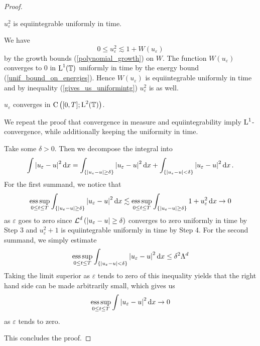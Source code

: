 \begin{proof}
\begin{description}[wide=0pt]
		\item[Step 4:] $ u_{ \varepsilon }^{ 2 } $ is equiintegrable uniformly 
		in time.
		
		We have 
		\begin{equation}
			\label{gives_us_uniformintg}
			0 \leq u_{ \varepsilon }^{ 2 } \lesssim 1 + W ( u_{ \varepsilon } )
		\end{equation}
		by the growth bounds (\ref{polynomial_growth}) on $ W $. The function $ 
		W ( u_{ \varepsilon } ) $ converges to 0 in $ \operatorname{L}^{ 1 } ( \operatorname{\mathbb{T}} ) 
		$ uniformly in time by the energy bound (\ref{unif_bound_on_energies}).
		Hence $ W ( u_{ \varepsilon } ) $ is equiintegrable uniformly in time 
		and by inequality (\ref{gives_us_uniformintg}) $ u_{ \varepsilon }^{ 2 
		} $ is as well.
		
		\item[Step 5:] $ u_{ \varepsilon } $ converges in $ \operatorname{C} \left( [ 0 , T ] ; \operatorname{L}^{ 2 } ( \operatorname{\mathbb{T}} ) \right) $.
		
		We repeat the proof that convergence in measure and 
		equiintegrability imply $ \operatorname{L}^{ 1 } $-convergence, while additionally 
		keeping the 
		uniformity in time.
		
		Take some $ \delta > 0 $. Then we decompose the integral into
		\begin{equation*}
			\int \abs{ u_{ \varepsilon } - u }^{ 2 } \dd{ x }
			=
			\int_{ \{ \abs{ u_{ \varepsilon } - u } \geq \delta \} }
			\abs{ u_{\varepsilon } - u }^{ 2 }
			\dd{ x }
			+
			\int_{ \{ \abs{ u_{ \varepsilon } - u } < \delta \} }
			\abs{ u_{ \varepsilon } - u }^{ 2 }
			\dd{ x }.
		\end{equation*}
		For the first summand, we notice that
		\begin{equation*}
			\operatorname*{ess\,sup}_{ 0 \leq t \leq T }
			\int_{ \{ \abs{ u_{ \varepsilon } - u } \geq \delta \} }
			\abs{ u_{\varepsilon } - u }^{ 2 }
			\dd{ x }
			\lesssim
			\operatorname*{ess\,sup}_{ 0 \leq t \leq T }
			\int_{ \{ \abs{ u_{ \varepsilon } - u } \geq \delta \} }
			1 + u_{\varepsilon }^{ 2 }
			\dd{ x }
			\to 0
		\end{equation*}
		as $ \varepsilon $ goes to zero since $ \operatorname{\mathcal{L}}^{ d }\left( \abs{ 
		u_{\varepsilon } - u } \geq \delta \right)  $ converges to zero 
		uniformly in time by Step 3 and $ u_{\varepsilon }^{ 2 } + 1 $ is 
		equiintegrable uniformly in time by Step 4.
		For the second summand, we simply estimate
		\begin{equation*}
			\operatorname*{ess\,sup}_{ 0 \leq t \leq T }
			\int_{ \{ \abs{ u_{ \varepsilon } - u } < \delta \} }
			\abs{ u_{ \varepsilon } - u }^{ 2 }
			\dd{ x }
			\leq
			\delta^{ 2 } \Lambda^{ d }
		\end{equation*}
		Taking the limit superior as $ \varepsilon $ tends to zero of this 
		inequality yields that the right hand side can be made arbitrarily 
		small, which gives us
		\begin{equation*}
			\operatorname*{ess\,sup}_{ 0 \leq t \leq T }
			\int
			\abs{ u_{ \varepsilon } - u }^{ 2 }
			\dd{ x }
			\to 
			0
		\end{equation*}
		as $ \varepsilon $ tends to zero.
	\end{description}
	This concludes the proof.
\end{proof}

